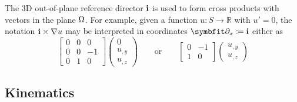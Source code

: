 \begin{remark}
The 3D out-of-plane reference director \(\mathbf{i}\) is used to form cross products with vectors in the plane \(\Omega\). 
For example, given a function \(u: S \rightarrow \mathbb{R}\) with \(u' = 0\), the notation \(\mathbf{i} \times \nabla u\) may be interpreted in coordinates \(\bm{\partial}_x \coloneq \FrameBasis\) either as 
\[
\begin{bmatrix}
0 & 0 & 0 \\
0 & 0 & -1 \\
0 & 1 & 0
\end{bmatrix}
\begin{pmatrix}
0 \\ u_{,y} \\ u_{,z}
\end{pmatrix}
\qquad\text{or}\qquad 
\begin{bmatrix}
0 & -1 \\
1 & 0
\end{bmatrix}
\begin{pmatrix}
u_{,y} \\ u_{,z}
\end{pmatrix}
\]
\end{remark}
\fi


\subsection{Kinematics}\label{sec:std-kinematics}


